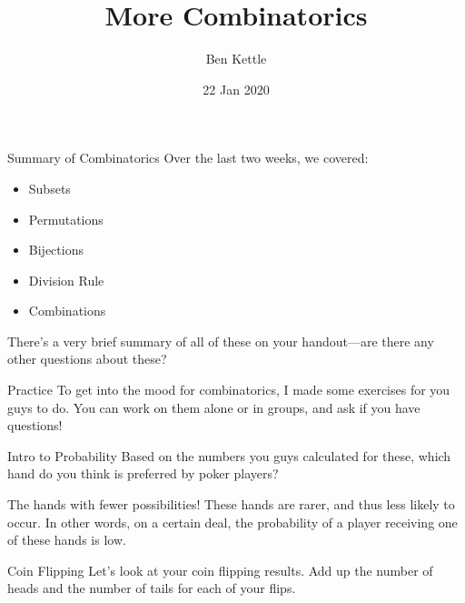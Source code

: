 \documentclass{beamer}
\title{More Combinatorics}
\author{Ben Kettle}
\date{22 Jan 2020}
\begin{document}
 
\frame{\titlepage}

\begin{frame}{Summary of Combinatorics}
    Over the last two weeks, we covered:
    \begin{itemize}
        \item Subsets
        \item Permutations
        \item Bijections
        \item Division Rule
        \item Combinations
    \end{itemize}
    There's a very brief summary of all of these on your handout---are there any other questions about these?
\end{frame}

\begin{frame}{Practice}
    To get into the mood for combinatorics, I made some exercises for you guys to do. You can work on them alone or in groups, and ask if you have questions!
\end{frame}

\begin{frame}{Intro to Probability}
    Based on the numbers you guys calculated for these, which hand do you think is preferred by poker players? \vspace{2mm}
    
    The hands with fewer possibilities! These hands are rarer, and thus less likely to occur. In other words, on a certain deal, the \alert{probability} of a player receiving one of these hands is low.
\end{frame}

\begin{frame}{Coin Flipping}
    Let's look at your coin flipping results. Add up the number of heads and the number of tails for each of your flips. \vspace{2mm}
    
    
\end{frame}
\end{document}
